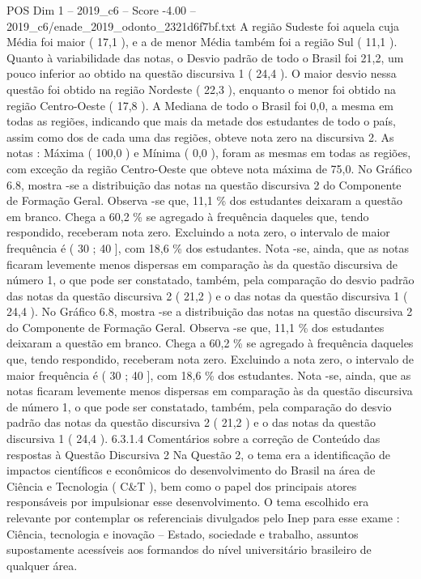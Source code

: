 \begin{textsample}{POS Dim 1 – 2019\_c6 – Score -4.00 – 2019\_c6/enade\_2019\_odonto\_2321d6f7bf.txt}
A região Sudeste foi aquela cuja Média foi maior ( 17,1 ), e a de menor Média também foi a região Sul ( 11,1 ).
Quanto à variabilidade das notas, o Desvio padrão de todo o Brasil foi 21,2, um pouco inferior ao obtido na questão discursiva 1 ( 24,4 ).
O maior desvio nessa questão foi obtido na região Nordeste ( 22,3 ), enquanto o menor foi obtido na região Centro-Oeste ( 17,8 ).
A Mediana de todo o Brasil foi 0,0, a mesma em todas as regiões, indicando que mais da metade dos estudantes de todo o país, assim como dos de cada uma das regiões, obteve nota zero na discursiva 2.
As notas : Máxima ( 100,0 ) e Mínima ( 0,0 ), foram as mesmas em todas as regiões, com exceção da região Centro-Oeste que obteve nota máxima de 75,0.
No Gráfico 6.8, mostra -se a distribuição das notas na questão discursiva 2 do Componente de Formação Geral.
Observa -se que, 11,1 \% dos estudantes deixaram a questão em branco.
Chega a 60,2 \% se agregado à frequência daqueles que, tendo respondido, receberam nota zero.
Excluindo a nota zero, o intervalo de maior frequência é ( 30 ; 40 ], com 18,6 \% dos estudantes.
Nota -se, ainda, que as notas ficaram levemente menos dispersas em comparação às da questão discursiva de número 1, o que pode ser constatado, também, pela comparação do desvio padrão das notas da questão discursiva 2 ( 21,2 ) e o das notas da questão discursiva 1 ( 24,4 ).
No Gráfico 6.8, mostra -se a distribuição das notas na questão discursiva 2 do Componente de Formação Geral.
Observa -se que, 11,1 \% dos estudantes deixaram a questão em branco.
Chega a 60,2 \% se agregado à frequência daqueles que, tendo respondido, receberam nota zero.
Excluindo a nota zero, o intervalo de maior frequência é ( 30 ; 40 ], com 18,6 \% dos estudantes.
Nota -se, ainda, que as notas ficaram levemente menos dispersas em comparação às da questão discursiva de número 1, o que pode ser constatado, também, pela comparação do desvio padrão das notas da questão discursiva 2 ( 21,2 ) e o das notas da questão discursiva 1 ( 24,4 ). 6.3.1.4 Comentários sobre a correção de Conteúdo das respostas à Questão Discursiva 2 Na Questão 2, o tema era a identificação de impactos científicos e econômicos do desenvolvimento do Brasil na área de Ciência e Tecnologia ( C\&T ), bem como o papel dos principais atores responsáveis por impulsionar esse desenvolvimento.
O tema escolhido era relevante por contemplar os referenciais divulgados pelo Inep para esse exame : Ciência, tecnologia e inovação – Estado, sociedade e trabalho, assuntos supostamente acessíveis aos formandos do nível universitário brasileiro de qualquer área.

\end{textsample}
